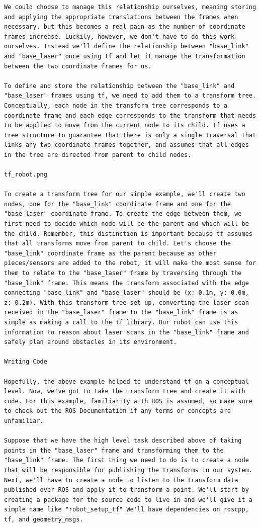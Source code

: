 \begin{verbatim}
We could choose to manage this relationship ourselves, meaning storing and applying the appropriate translations between the frames when necessary, but this becomes a real pain as the number of coordinate frames increase. Luckily, however, we don't have to do this work ourselves. Instead we'll define the relationship between "base_link" and "base_laser" once using tf and let it manage the transformation between the two coordinate frames for us.

To define and store the relationship between the "base_link" and "base_laser" frames using tf, we need to add them to a transform tree. Conceptually, each node in the transform tree corresponds to a coordinate frame and each edge corresponds to the transform that needs to be applied to move from the current node to its child. Tf uses a tree structure to guarantee that there is only a single traversal that links any two coordinate frames together, and assumes that all edges in the tree are directed from parent to child nodes.

tf_robot.png

To create a transform tree for our simple example, we'll create two nodes, one for the "base_link" coordinate frame and one for the "base_laser" coordinate frame. To create the edge between them, we first need to decide which node will be the parent and which will be the child. Remember, this distinction is important because tf assumes that all transforms move from parent to child. Let's choose the "base_link" coordinate frame as the parent because as other pieces/sensors are added to the robot, it will make the most sense for them to relate to the "base_laser" frame by traversing through the "base_link" frame. This means the transform associated with the edge connecting "base_link" and "base_laser" should be (x: 0.1m, y: 0.0m, z: 0.2m). With this transform tree set up, converting the laser scan received in the "base_laser" frame to the "base_link" frame is as simple as making a call to the tf library. Our robot can use this information to reason about laser scans in the "base_link" frame and safely plan around obstacles in its environment.

Writing Code

Hopefully, the above example helped to understand tf on a conceptual level. Now, we've got to take the transform tree and create it with code. For this example, familiarity with ROS is assumed, so make sure to check out the ROS Documentation if any terms or concepts are unfamiliar.

Suppose that we have the high level task described above of taking points in the "base_laser" frame and transforming them to the "base_link" frame. The first thing we need to do is to create a node that will be responsible for publishing the transforms in our system. Next, we'll have to create a node to listen to the transform data published over ROS and apply it to transform a point. We'll start by creating a package for the source code to live in and we'll give it a simple name like "robot_setup_tf" We'll have dependencies on roscpp, tf, and geometry_msgs.


\end{verbatim}
